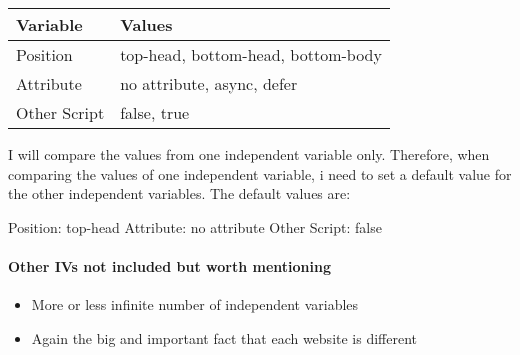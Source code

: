 \begin{table}[]
	\centering
	\begin{tabular}{| l | l | }
	\hline
	Variable & Values \\
	\hline
	Position & top-head, bottom-head, bottom-body \\
	Attribute & no attribute, async, defer \\
	Other Script & false, true \\
	\hline
	\end{tabular}
\end{table}

I will compare the values from one independent variable only.
Therefore, when comparing the values of one independent variable, i need to set a default value for the other independent variables.
The default values are:

Position: top-head
Attribute: no attribute
Other Script: false






\paragraph{Other IVs not included but worth mentioning}

\begin{itemize}
\item More or less infinite number of independent variables
\item Again the big and important fact that each website is different
\end{itemize}









